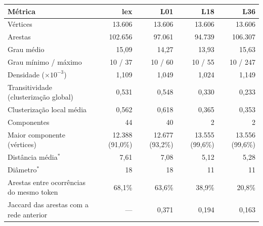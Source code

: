 \begin{tabular}{lrrrr}
\toprule
Métrica & lex & L01 & L18 & L36 \\
\midrule
Vértices & 13.606 & 13.606 & 13.606 & 13.606 \\
Arestas & 102.656 & 97.061 & 94.739 & 106.307 \\
Grau médio & 15,09 & 14,27 & 13,93 & 15,63 \\
Grau mínimo / máximo & 10 / 37 & 10 / 60 & 10 / 55 & 10 / 247 \\
Densidade ($\times 10^{-3}$) & 1,109 & 1,049 & 1,024 & 1,149 \\
Transitividade (clusterização global) & 0,531 & 0,548 & 0,330 & 0,233 \\
Clusterização local média & 0,562 & 0,618 & 0,365 & 0,353 \\
Componentes & 44 & 40 & 2 & 2 \\
Maior componente (vértices) & 12.388 (91,0\%) & 12.677 (93,2\%) & 13.555 (99,6\%) & 13.556 (99,6\%) \\
Distância média$^\ast$ & 7,61 & 7,08 & 5,12 & 5,28 \\
Diâmetro$^\ast$ & 18 & 18 & 11 & 11 \\
\midrule
Arestas entre ocorrências do mesmo token & 68,1\% & 63,6\% & 38,9\% & 20,8\% \\
Jaccard das arestas com a rede anterior & --- & 0,371 & 0,194 & 0,163 \\
\bottomrule
\end{tabular}
